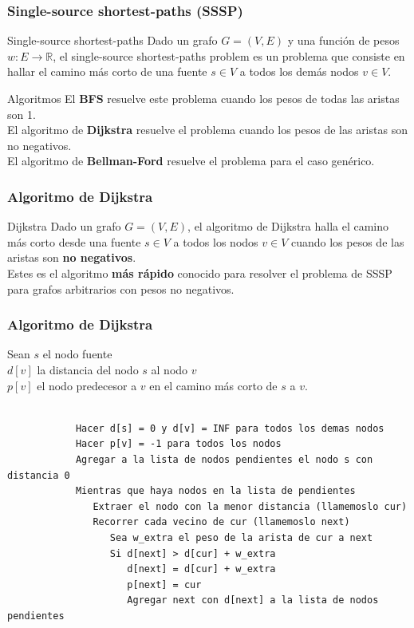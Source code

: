 \documentclass{beamer}
\begin{document}
	\begin{frame}
		\frametitle{Single-source shortest-paths (SSSP)}
		\begin{block}{Single-source shortest-paths}
			Dado un grafo $G = (V, E)$ y una función de pesos $w : E \rightarrow \mathbb{R}$, el single-source shortest-paths problem es un problema que consiste en hallar el camino más corto de una fuente $s \in V$ a todos los demás nodos $v \in V$.\\
		\end{block}
		\begin{exampleblock}{Algoritmos}
			El \textbf{BFS} resuelve este problema cuando los pesos de todas las aristas son 1.\\
			El algoritmo de \textbf{Dijkstra} resuelve el problema cuando los pesos de las aristas son no negativos.\\
			El algoritmo de \textbf{Bellman-Ford} resuelve el problema para el caso genérico.
		\end{exampleblock}
	\end{frame}
	
	\begin{frame}
		\frametitle{Algoritmo de Dijkstra}
		\begin{block}{Dijkstra}
			Dado un grafo $G = (V, E)$, el algoritmo de Dijkstra halla el camino más corto desde una fuente $s \in V$ a todos los nodos $v \in V$ cuando los pesos de las aristas son \textbf{no negativos}.\\
			Estes es el algoritmo \textbf{más rápido} conocido para resolver el problema de SSSP para grafos arbitrarios con pesos no negativos.
		\end{block}
	\end{frame}
	
	\begin{frame}[fragile]
		\frametitle{Algoritmo de Dijkstra}
		Sean $s$ el nodo fuente\\
		\qquad $d[v]$ la distancia del nodo $s$ al nodo $v$\\
		\qquad $p[v]$ el nodo predecesor a $v$ en el camino más corto de $s$ a $v$.\\ \quad \\
		\begin{lstlisting}
			Hacer d[s] = 0 y d[v] = INF para todos los demas nodos
			Hacer p[v] = -1 para todos los nodos
			Agregar a la lista de nodos pendientes el nodo s con distancia 0
			Mientras que haya nodos en la lista de pendientes
			   Extraer el nodo con la menor distancia (llamemoslo cur)
			   Recorrer cada vecino de cur (llamemoslo next)
			      Sea w_extra el peso de la arista de cur a next
			      Si d[next] > d[cur] + w_extra
			         d[next] = d[cur] + w_extra
			         p[next] = cur
			         Agregar next con d[next] a la lista de nodos pendientes
		\end{lstlisting}
	\end{frame}
	
\end{document}
